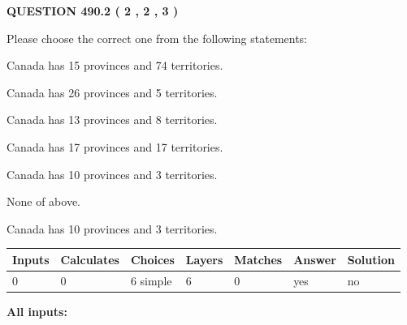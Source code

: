\documentclass[12pt]{article}
\begin{document}
   
  
\vspace{0.2in}
  
{\textbf{\Large{QUESTION
490.2 
 ( 2 , 2 , 3 )
}}}
  
  
Please choose the correct one from the following statements:
 
 
Canada has  15 provinces and  74 territories.
 
 
Canada has  26 provinces and  5 territories.
 
 
Canada has  13 provinces and  8 territories.
 
 
Canada has  17 provinces and  17 territories.
 
 
Canada has 10  provinces and 3 territories.
 
 
 None of above.
 
 
\noindent{}
 
 
Canada has 10  provinces and 3 territories.
 
 
\noindent{}
 
 
   
   
   
   
\noindent\begin{tabular}{|l|l|l|l|l|l|l|}
 \hline
Inputs & Calculates & Choices & Layers & Matches & Answer & Solution \\ \hline
 0  & 
 0  & 
 6
  simple  
  & 
 6  & 
 0  & 
  yes & 
  no 
  \\ \hline
 \end{tabular}
   
   
   
   
\noindent{}
   
   
   
   
\noindent\vspace{0.1in}\hspace{-0.08in} {\textbf{\Large{All inputs: }}}
   
   
   
   
   
   
 \vspace{0.2in}
 
\end{document}

